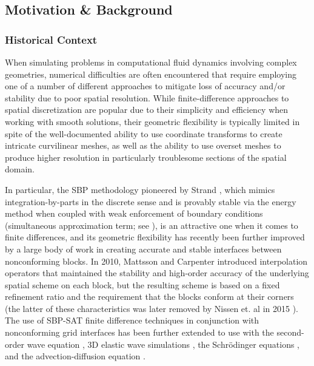 \subsection{Motivation \& Background}

\subsubsection{Historical Context}

When simulating problems in computational fluid dynamics involving complex
geometries, numerical difficulties are often encountered that require
employing one of a number of different approaches to mitigate loss of accuracy and/or stability
due to poor spatial resolution. While finite-difference approaches to spatial
discretization are popular due to their simplicity and efficiency when working
with smooth solutions, their geometric flexibility is typically limited in spite
of the well-documented ability to use coordinate transforms to create intricate
curvilinear meshes, as well as the ability to use overset meshes to produce
higher resolution in particularly troublesome sections of the spatial domain.

In particular, the SBP methodology pioneered by Strand \cite{strand1994summation},
which mimics
integration-by-parts in the discrete sense and is provably stable via the energy method when coupled with weak enforcement of boundary conditions (simultaneous approximation term; see \cite{svard2007stable}),
is an attractive one when it comes to finite differences, and its geometric
flexibility has recently been further improved by a large body of work in creating
accurate and stable interfaces between nonconforming blocks. In 2010, Mattsson and
Carpenter \cite{mattsson2010stable} introduced interpolation operators that maintained
the stability and high-order accuracy of the underlying spatial scheme on each block,
but the resulting scheme is based on a fixed refinement ratio and the requirement that
the blocks conform at their corners (the latter of these characteristics was
later removed by Nissen et. al in 2015 \cite{nissen2015stable}). The use of SBP-SAT finite
difference techniques in conjunction with nonconforming grid interfaces has been further
extended to use with the second-order wave equation \cite{wang2016high}, 3D elastic wave
simulations \cite{gao2020energy}, the Schr{\"o}dinger equations \cite{nissen2012stability}, and the advection-diffusion equation \cite{lundquist2018hybrid}. 

